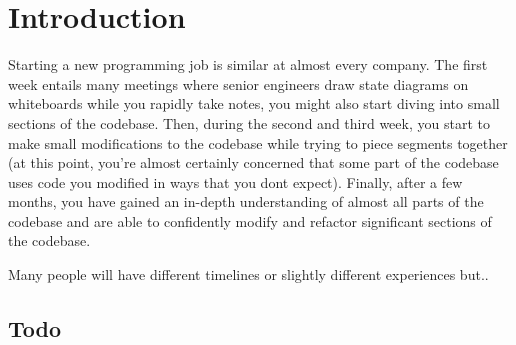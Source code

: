 \chapter{Introduction}

Starting a new programming job is similar at almost every company. The first week entails many meetings where senior engineers draw state diagrams on whiteboards while you rapidly take notes, you might also start diving into small sections of the codebase. Then, during the second and third week, you start to make small modifications to the codebase while trying to piece segments together (at this point, you're almost certainly concerned that some part of the codebase uses code you modified in ways that you dont expect). Finally, after a few months, you have gained an in-depth understanding of almost all parts of the codebase and are able to confidently modify and refactor significant sections of the codebase. 

Many people will have different timelines or slightly different experiences but.. 
\section{Todo}
